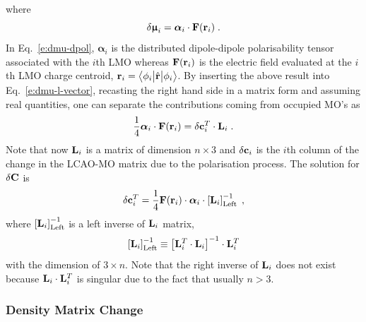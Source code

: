 \documentclass[aip,amsmath,amssymb,reprint,floatfix]{revtex4-1}
\newcommand{\tbraket}[3]{\ensuremath{\bigl\langle {#1} \bigl\lvert {#2} \bigl\lvert {#3} \bigr\rangle}}
\newcommand{\BM}[1]{\bm{#1}}
\begin{document}
%
where
%
\begin{equation} \label{e:dmu-dpol}
 \delta {\BM{\upmu}}_i = {\BM{\alpha}}_i \cdot {\bf F}({\bf r}_i) \;.
\end{equation}
%
In Eq.~\eqref{e:dmu-dpol}, ${\BM{\alpha}}_i$ is the distributed dipole\hyp{}dipole polarisability tensor
associated with the $i$th LMO whereas ${\bf F}({\bf r}_i)$ 
is the electric field evaluated at the $i$th LMO charge centroid,
${\bf r}_i = \tbraket{\phi_i}{\hat{\bf r}}{\phi_i}$.
By inserting the above result into Eq.~\eqref{e:dmu-l-vector},
recasting the right hand side in a matrix form
and assuming real quantities,
one can separate the contributions coming from occupied MO's as
%
\begin{equation} \label{e:dmu-l-vector-mo-transform-X}
 \frac{1}{4} {\BM{\alpha}}_i \cdot {\bf F}({\bf r}_i) 
   =
   \delta {\bf c}_i^T \cdot {\bf L}_i \;.
\end{equation}
%
Note that now ${\bf L}_i$ is a matrix of dimension $n \times 3$ and $\delta{\bf c}_i$ is the $i$th column of the
change in the LCAO-MO matrix due to the polarisation process.
The solution for $\delta {\bf C}$ is
%
\begin{equation} \label{e:mu-ind.matrix.linear.solution}
  \delta {\bf c}_i^T = \frac{1}{4}
            {\bf F}({\bf r}_i)  \cdot {\BM{\alpha}}_i \cdot 
                    \left[ {\bf L}_i  \right]^{-1}_{\rm Left} \;,
\end{equation}
%
where $\left[ {\bf L}_i  \right]^{-1}_{\rm Left}$ is a left inverse
of ${\bf L}_i$ matrix,
%
\begin{equation} 
      \left[ {\bf L}_i  \right]^{-1}_{\rm Left}   \equiv
       \left[ {\bf L}_i^T \cdot {\bf L}_i \right]^{-1} \cdot {\bf L}_i^T   
\end{equation}
%
with the dimension of $3\times n$. Note that the right inverse of ${\bf L}_i$
does not exist because ${\bf L}_i \cdot {\bf L}_i^T$ is singular due to the fact that usually
$n > 3$.

\subsubsection{Density Matrix Change}
\end{document}
